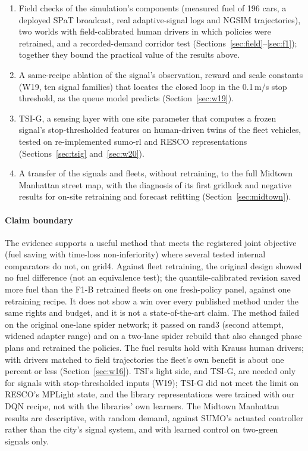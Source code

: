 \begin{enumerate}
\item Field checks of the simulation's components (measured fuel of 196 cars, a deployed SPaT broadcast, real adaptive-signal logs and
NGSIM trajectories), two worlds with field-calibrated human drivers in which policies were retrained, and a recorded-demand corridor test
(Sections~\ref{sec:field}--\ref{sec:f1}); together they bound the practical value of the results above.
\item A same-recipe ablation of the signal's observation, reward and scale constants (W19, ten signal families) that locates the closed
loop in the 0.1\,m/s stop threshold, as the queue model predicts (Section~\ref{sec:w19}).
\item TSI-G, a sensing layer with one site parameter that computes a frozen signal's stop-thresholded features on human-driven twins of
the fleet vehicles, tested on re-implemented sumo-rl and RESCO representations (Sections~\ref{sec:tsig} and~\ref{sec:w20}).
\item A transfer of the signals and fleets, without retraining, to the full Midtown Manhattan street map, with the diagnosis of its first
gridlock and negative results for on-site retraining and forecast refitting (Section~\ref{sec:midtown}).
\end{enumerate}

\paragraph{Claim boundary} The evidence supports a useful method that meets the registered joint objective (fuel saving with
time-loss non-inferiority) where several tested internal comparators do not, on grid4. Against fleet retraining, the original design
showed no fuel difference (not an equivalence test); the quantile-calibrated revision saved more fuel than the F1-B retrained fleets on one
fresh-policy panel, against one retraining recipe. It does not show a win over every
published method under the same rights and budget, and it is not a state-of-the-art claim. The method failed on the original one-lane
spider network; it passed on rand3 (second attempt, widened adapter range) and on a two-lane spider rebuild that also changed phase plans
and retrained the policies. The fuel results hold with Krauss human drivers; with drivers matched to field trajectories the fleet's own
benefit is about one percent or less (Section~\ref{sec:w16}). TSI's light side, and TSI-G, are needed only for signals with
stop-thresholded inputs (W19); TSI-G did not meet the limit on RESCO's MPLight state, and the library representations were trained with
our DQN recipe, not with the libraries' own learners. The Midtown Manhattan results are descriptive, with random demand, against SUMO's
actuated controller rather than the city's signal system, and with learned control on two-green signals only.

